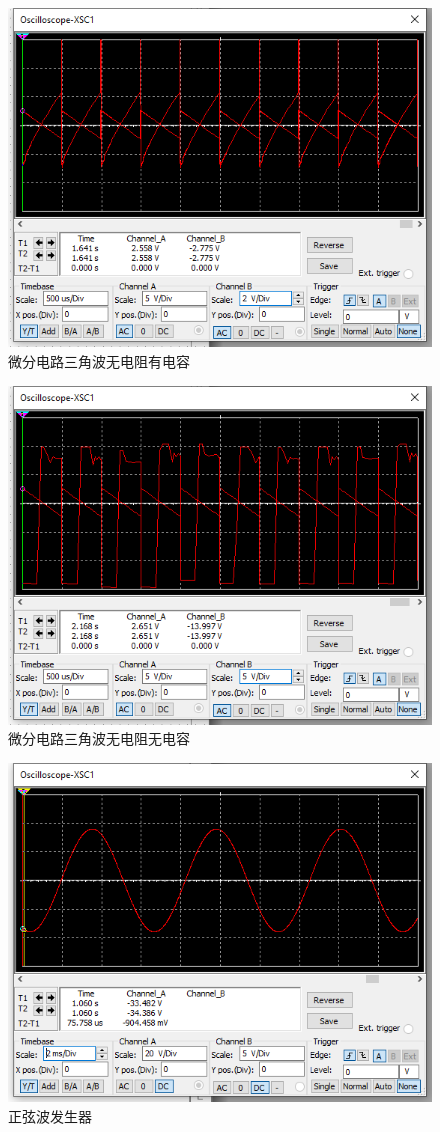 \documentclass{ctexart}
\begin{document}
\begin{figure}[H]
  \centering
  \includegraphics[width=0.75\linewidth]{电路设计/微分电路/微分电路三角波无电阻有电容.png}
  \caption{微分电路三角波无电阻有电容}
\end{figure}

\begin{figure}[H]
  \centering
  \includegraphics[width=0.75\linewidth]{电路设计/微分电路/微分电路三角波无电阻无电容.png}
  \caption{微分电路三角波无电阻无电容}
\end{figure}



\begin{figure}[H]
  \centering
  \includegraphics[width=0.75\linewidth]{电路设计/正弦波发生器/正弦波发生器示波器.png}
  \caption{正弦波发生器}
\end{figure}
\end{document}

